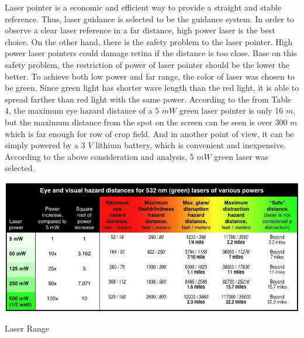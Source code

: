 \documentclass[12pt]{article}
\begin{document}
\begin{flushleft}
Laser pointer is a economic and efficient way to provide a straight and stable reference. Thus, laser guidance is selected to be the guidance system. In order to observe a clear laser reference in a far distance, high power laser is the best choice. On the other hand, there is the safety problem to the laser pointer. High power laser pointers could damage retina if the distance is too close. Base on this safety problem, the restriction of power of laser pointer should be the lower the better. To achieve both low power and far range, the color of laser was chosen to be green. Since green light has shorter wave length than the red light, it is able to spread farther than red light with the same power. According to the from Table 4, the maximum eye hazard distance of a 5 $mW$ green laser pointer is only 16 $m$, but the maximum distance from the spot on the screen can be seen is over 300 $m$ which is far enough for row of crop field. And in another point of view, it can be simply powered by a 3 $V$ lithium battery, which is convenient and inexpensive. According to the above consideration and analysis, 5 $mW$ green laser was selected.
\begin{table}[ht!]
	\begin{center}
		\includegraphics[scale = 0.5]{laserrange.jpg}
		\caption{Laser Range}
	\end{center}
\end{table}


\end{flushleft}
\end{document}
